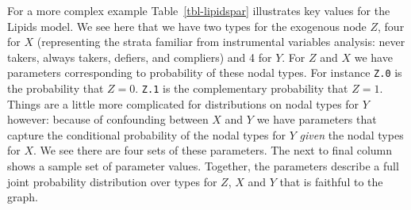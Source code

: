 \documentclass[
  11pt,
  article]{jss}
\begin{document}
For a more complex example Table~\ref{tbl-lipidspar} illustrates key
values for the Lipids model. We see here that we have two types for the
exogenous node \(Z\), four for \(X\) (representing the strata familiar
from instrumental variables analysis: never takers, always takers,
defiers, and compliers) and 4 for \(Y\). For \(Z\) and \(X\) we have
parameters corresponding to probability of these nodal types. For
instance \texttt{Z.0} is the probability that \(Z=0\). \texttt{Z.1} is
the complementary probability that \(Z=1\). Things are a little more
complicated for distributions on nodal types for \(Y\) however: because
of confounding between \(X\) and \(Y\) we have parameters that capture
the conditional probability of the nodal types for \(Y\) \emph{given}
the nodal types for \(X\). We see there are four sets of these
parameters. The next to final column shows a sample set of parameter
values. Together, the parameters describe a full joint probability
distribution over types for \(Z\), \(X\) and \(Y\) that is faithful to
the graph.
\end{document}

